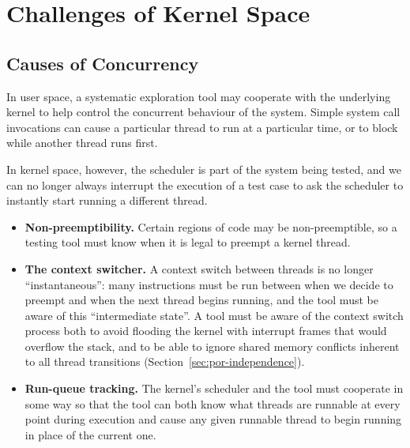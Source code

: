 \chapter{Challenges of Kernel Space}
\label{sec:challenges}

\section{Causes of Concurrency}

In user space, a systematic exploration tool may cooperate with the underlying kernel to help control the concurrent behaviour of the system\cite{dbug-ssv}. Simple system call invocations can cause a particular thread to run at a particular time, or to block while another thread runs first.

In kernel space, however, the scheduler is part of the system being tested, and we can no longer always interrupt the execution of a test case to ask the scheduler to instantly start running a different thread.
\begin{itemize}
	\item {\bf Non-preemptibility.} Certain regions of code may be non-preemptible, so a testing tool must know when it is legal to preempt a kernel thread.
	\item {\bf The context switcher.} A context switch between threads is no longer ``instantaneous'': many instructions must be run between when we decide to preempt and when the next thread begins running, and the tool must be aware of this ``intermediate state''. A tool must be aware of the context switch process both to avoid flooding the kernel with interrupt frames that would overflow the stack, and to be able to ignore shared memory conflicts inherent to all thread transitions (Section~\ref{sec:por-independence}).
	\item {\bf Run-queue tracking.} The kernel's scheduler and the tool must cooperate in some way so that the tool can both know what threads are runnable at every point during execution and cause any given runnable thread to begin running in place of the current one.
\end{itemize}

